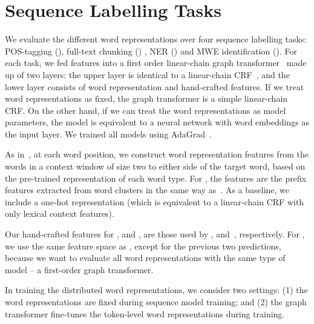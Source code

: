 \section{Sequence Labelling Tasks}
\label{sec:SeqTagging}

We evaluate the different word representations over four sequence
labelling tasks: POS-tagging (\pos), full-text chunking (\chunking) ,
NER (\ner) and MWE identification (\mwe). For
each task, we fed features into a first order linear-chain graph
transformer~\cite{collobert2011natural} made up of two layers: the upper
layer is identical to a linear-chain CRF~\cite{lafferty2001conditional},
and the lower layer consists of word representation and hand-crafted
features. If we treat word representations as fixed, the graph
transformer is a simple linear-chain CRF. On the other hand, if we can
treat the word representations as model parameters, the model is
equivalent to a neural network with word embeddings as the input
layer. We trained all models using AdaGrad~\cite{duchi2011adaptive}.




As in~, at each word position, we construct word
representation features from the words in a context window of size two
to either side of the target word, based on the pre-trained
representation of each word type.  For \brown, the features are the
prefix features extracted from word clusters in the same way
as~. As a baseline, we include a one-hot
representation (which is equivalent to a linear-chain CRF with only
lexical context features).

Our hand-crafted features for \pos, \chunking and \mwe, are those used
by , 
and~, respectively. For \ner, we use the same feature
space as , except for the previous two
predictions, because we want to evaluate all word representations with
the same type of model -- a first-order graph transformer.

In training the distributed word representations, we consider two
settings: (1) the word representations are fixed during sequence model
training; and (2) the graph transformer fine-tunes the token-level word
representations during training.


